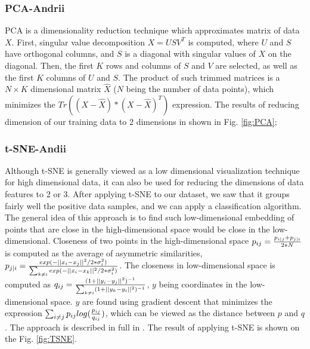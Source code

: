 \documentclass{article} %
\begin{document}

\subsubsection{PCA-Andrii}

	
PCA is a dimensionality reduction technique which approximates matrix of data
$X$. First, singular value decomposition $X=USV^T$ is computed, where $U$ and
$S$ have orthogonal columns, and $S$ is a diagonal with singular values of $X$
on the diagonal. Then, the first $K$ rows and columns of $S$ and $V$ are selected,
as well as the first $K$ columns of $U$ and $S$. The product of such trimmed
matrices is a $N \times K$ dimensional matrix $\hat{X}$ ($N$ being the number of
data points), which minimizes the $Tr((X-\hat{X}) * (X-\hat{X})^T)$ expression. The
results of reducing dimension of our training data to 2 dimensions in shown in
Fig. \ref{fig:PCA};



\subsubsection{t-SNE-Andii}

Although t-SNE is generally viewed as a low dimensional visualization technique 
for high dimensional data, it can also be used for reducing the dimensions of 
data features to 2 or 3. After applying t-SNE to our dataset, we saw
that it groups fairly well the positive data samples, and we can apply a 
classification algorithm. The general idea of this approach is to find such 
low-dimensional embedding of points that are close in the high-dimensional 
space would be close in the low-dimensional. Closeness of two points in the high-dimensional
space $p_{ij} = {p_{i|j} + p_{j|i}\over 2 * N}$ is computed as the average of
asymmetric similarities, $p_{j|i} = {exp(-||x_i-x_j||^2 / 2 * \sigma_i^2) \over
\sum_{k \neq i}exp(-||x_i-x_k||^2 / 2 * \sigma_i^2)}$. The closeness in
low-dimensional space is computed as $q_{ij}={ (1 + ||y_i-y_j||^2)^{-1}\over
\sum_{k \neq i}(1+||y_k - y_i||^2)^{-1}} $, $y$ being coordinates in the
low-dimensional space. $y$ are found using gradient descent that minimizes the 
expression $\sum_{i \neq j}p_{ij}log({p_{ij}\over q_{ij}})$, which can be viewed 
as the distance between $p$ and $q$. The approach is described in full 
in \cite{van2008visualizing}. The result of applying t-SNE is shown on
the Fig. \ref{fig:TSNE}.
\end{document}
